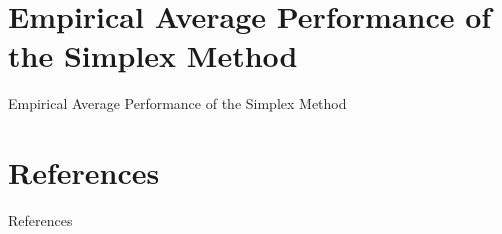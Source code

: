 \documentclass[10pt]{beamer}
\begin{document}
\section{Empirical Average Performance of the Simplex Method}
\begin{frame}{Empirical Average Performance of the Simplex Method}

\end{frame}

\section{References}
\begin{frame}[allowframebreaks]{References}
\printbibliography
\end{frame}
\end{document}
